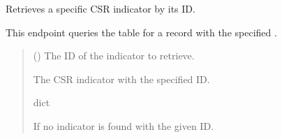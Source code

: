 \documentclass[letterpaper,10pt,english]{sphinxmanual}
\begin{document}

\begin{fulllineitems}
\label{\detokenize{my_fastapi:my_fastapi.main.get_indicator_by_id}}
\pysigstartsignatures
\pysiglinewithargsret
{}
{}
{}
\pysigstopsignatures
\sphinxAtStartPar
Retrieves a specific CSR indicator by its ID.

\sphinxAtStartPar
This endpoint queries the  table for a record with the specified .
\begin{quote}\begin{description}
\sphinxAtStartPar
{} () \textendash{} The ID of the indicator to retrieve.

\sphinxAtStartPar
The CSR indicator with the specified ID.

\sphinxAtStartPar
dict

\sphinxAtStartPar
{} \textendash{} If no indicator is found with the given ID.

\end{description}\end{quote}

\end{fulllineitems}

\end{document}
